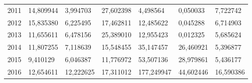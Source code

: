 \begin{table}
\begin{tabular}{p{1cm}p{2cm}p{2cm}p{2cm}p{2cm}p{2cm}p{2cm}}
 2011 &       14,809944 &                          3,994703 &                  27,602398 &             4,498564 &                     0,050033 &  7,722742 \\
 2012 &       15,835380 &                          6,225495 &                  17,462811 &            12,485622 &                     0,045288 &  6,714903 \\
 2013 &       11,655611 &                          6,478156 &                  25,389010 &            12,955423 &                     0,012325 &  5,685624 \\
 2014 &       11,807255 &                          7,118639 &                  15,548455 &            35,147457 &                    26,460921 &  5,396877 \\
 2015 &        9,410129 &                          6,046387 &                  11,776972 &            53,507136 &                    28,979861 &  5,436177 \\
 2016 &       12,654611 &                         12,222625 &                  17,311012 &           177,249947 &                    44,602446 & 16,590386 \\
\bottomrule
\end{tabular}
\end{table}
